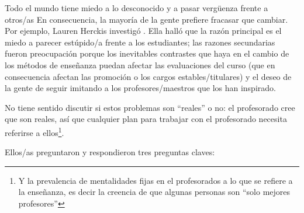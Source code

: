 Todo el mundo tiene miedo a lo desconocido y a pasar vergüenza frente a otros/as
En consecuencia,
la mayoría de la gente prefiere fracasar que cambiar.
Por ejemplo,
Lauren Herckis investigó 
.
Ella halló que la razón principal es el miedo a parecer estúpido/a frente a los estudiantes;
las razones secundarias fueron
preocupación porque los inevitables contrastes que haya en el cambio de los métodos de enseñanza puedan afectar las evaluaciones del curso
(que en consecuencia afectan las promoción o los cargos estables/titulares)
y el deseo de la gente de seguir imitando a los profesores/maestros que los han inspirado.

No tiene sentido discutir si estos problemas son ``reales'' o no:
el profesorado cree que son reales,
así que cualquier plan para trabajar con el profesorado necesita referirse a ellos\footnote{
Y la prevalencia de mentalidades fijas en el profesorados a lo que se refiere a la enseñanza, es decir la creencia de que algunas personas son ``solo mejores profesores'' }.

Ellos/as preguntaron y respondieron tres preguntas claves:

